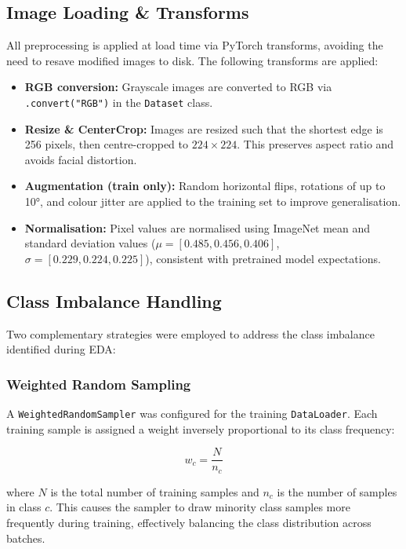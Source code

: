 \documentclass[12pt, a4paper]{article}
\begin{document}
\subsection{Image Loading \& Transforms}

All preprocessing is applied at load time via PyTorch transforms, avoiding the need to resave modified images to disk. The following transforms are applied:

\begin{itemize}
    \item \textbf{RGB conversion:} Grayscale images are converted to RGB via \texttt{.convert("RGB")} in the \texttt{Dataset} class.
    \item \textbf{Resize \& CenterCrop:} Images are resized such that the shortest edge is 256 pixels, then centre-cropped to $224 \times 224$. This preserves aspect ratio and avoids facial distortion.
    \item \textbf{Augmentation (train only):} Random horizontal flips, rotations of up to 10°, and colour jitter are applied to the training set to improve generalisation.
    \item \textbf{Normalisation:} Pixel values are normalised using ImageNet mean and standard deviation values ($\mu = [0.485, 0.456, 0.406]$, $\sigma = [0.229, 0.224, 0.225]$), consistent with pretrained model expectations.
\end{itemize}

\subsection{Class Imbalance Handling}

Two complementary strategies were employed to address the class imbalance identified during EDA:

\subsubsection{Weighted Random Sampling}

A \texttt{WeightedRandomSampler} was configured for the training \texttt{DataLoader}. Each training sample is assigned a weight inversely proportional to its class frequency:

\begin{equation}
    w_c = \frac{N}{n_c}
\end{equation}

where $N$ is the total number of training samples and $n_c$ is the number of samples in class $c$. This causes the sampler to draw minority class samples more frequently during training, effectively balancing the class distribution across batches.
\end{document}
